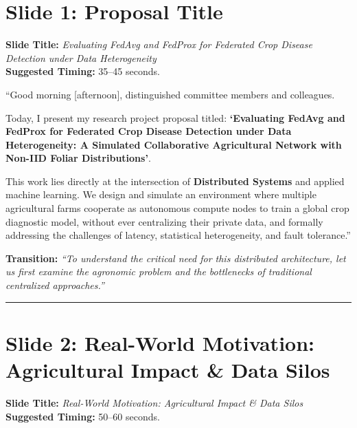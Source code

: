 \documentclass[11pt,a4paper]{article}
\begin{document}
\section{Slide 1: Proposal Title}
\textbf{Slide Title:} \textit{Evaluating FedAvg and FedProx for Federated Crop Disease Detection under Data Heterogeneity} \\
\textbf{Suggested Timing:} 35--45 seconds.

\begin{tcolorbox}[colframe=primaryblue, title=\textbf{What to Say in the Presentation (Literal Script)}]
``Good morning [afternoon], distinguished committee members and colleagues.

Today, I present my research project proposal titled: \textbf{`Evaluating FedAvg and FedProx for Federated Crop Disease Detection under Data Heterogeneity: A Simulated Collaborative Agricultural Network with Non-IID Foliar Distributions'}.

This work lies directly at the intersection of \textbf{Distributed Systems} and applied machine learning. We design and simulate an environment where multiple agricultural farms cooperate as autonomous compute nodes to train a global crop diagnostic model, without ever centralizing their private data, and formally addressing the challenges of latency, statistical heterogeneity, and fault tolerance.''
\end{tcolorbox}

\textbf{Transition:} \textit{``To understand the critical need for this distributed architecture, let us first examine the agronomic problem and the bottlenecks of traditional centralized approaches.''}

\vspace{0.35cm}\hrule\vspace{0.35cm}

\section{Slide 2: Real-World Motivation: Agricultural Impact \& Data Silos}
\textbf{Slide Title:} \textit{Real-World Motivation: Agricultural Impact \& Data Silos} \\
\textbf{Suggested Timing:} 50--60 seconds.
\end{document}
